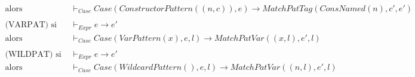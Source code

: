 \documentclass[
  12pt,
]{article}
\begin{document}
\begin{align*}
  \text{alors}                 & \vdash_{Case} Case(ConstructorPattern((n,c)), e)
  \rightarrow  MatchPatTag(ConsNamed(n), c', e')                                                                    \\
  \\
  \text{(VARPAT)} \text{ si }  & \vdash_{Expr} e \rightarrow  e'                                                    \\
  \text{alors}                 & \vdash_{Case} Case(VarPattern(x), e, l)
  \rightarrow  MatchPatVar((x, l), e', l)                                                                           \\
  \\
  \text{(WILDPAT)}
  \text{ si }                  & \vdash_{Expr} e \rightarrow  e'                                                    \\
  \text{alors}                 & \vdash_{Case} Case(WildcardPattern(), e, l)
  \rightarrow  MatchPatVar((n, l), e', l)
\end{align*}
\end{document}
